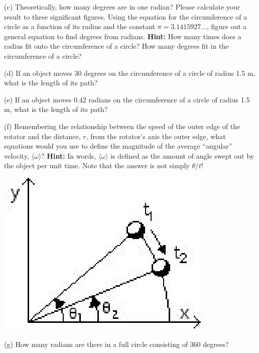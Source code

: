 (c) Theoretically, how many degrees are in one radian? Please calculate your
result to three significant figures. Using the equation for the circumference
of a circle as a function of its radius and the constant $\pi=3.1415927$..., 
figure
out a general equation to find degrees from radians. \textbf{Hint:} How many
times does a radius fit onto the circumference of a circle? How many degrees
fit in the circumference of a circle?
\vspace{20mm}

(d) If an object moves 30 degrees on the circumference of a circle of radius
1.5 m, what is the length of its path?
\vspace{20mm}

(e) If an object moves 0.42 radians on the circumference of a circle of radius
1.5 m, what is the length of its path?
\vspace{20mm}

(f) Remembering the relationship between the speed of the outer edge of the
rotator and the distance, $r$, 
from the rotator's axis the outer edge, what equations
would you use to define the magnitude of the average ``angular''
velocity, \( \langle\omega \rangle \)? \textbf{Hint:} In words, 
\( \langle\omega \rangle \) is defined
as the amount of angle swept out by the object per unit time. Note that the
answer is not simply \( \theta/t  \)!

\vspace{0.3cm}
{\par\raggedright \includegraphics{rotation_fig8.eps} \par}
\vspace{0.3cm}

(g) How many radians are there in a full circle consisting of 360 degrees?
\vspace{10mm}

